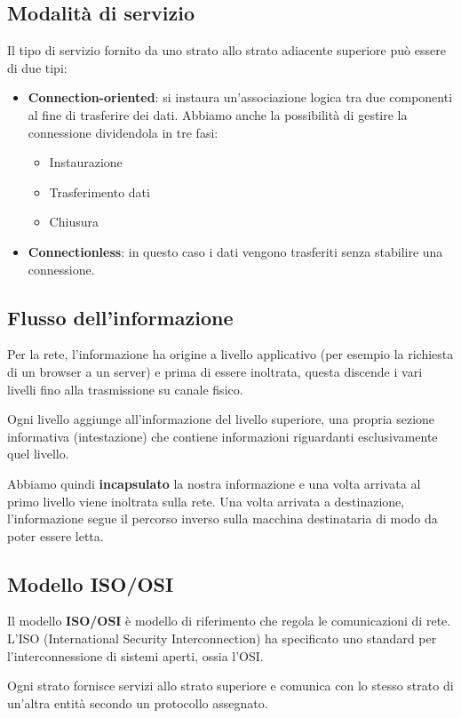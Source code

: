 \subsection{Modalità di servizio}
Il tipo di servizio fornito da uno strato allo strato adiacente superiore può essere di due tipi:
\begin{itemize}
	\item \textbf{Connection-oriented}: si instaura un'associazione logica tra due componenti al 
		fine di trasferire dei dati. Abbiamo anche la possibilità di gestire la connessione
		dividendola in tre fasi:
		\begin{itemize}
			\item Instaurazione
			\item Trasferimento dati
			\item Chiusura
		\end{itemize}
	\item \textbf{Connectionless}: in questo caso i dati vengono trasferiti senza stabilire una
		connessione.
\end{itemize}

\subsection{Flusso dell'informazione}
Per la rete, l'informazione ha origine a livello applicativo (per esempio la richiesta di un
browser a un server) e prima di essere inoltrata, questa discende i vari livelli fino alla
trasmissione su canale fisico.

Ogni livello aggiunge all'informazione del livello superiore, una propria sezione informativa
(intestazione) che contiene informazioni riguardanti esclusivamente quel livello.

Abbiamo quindi \textbf{incapsulato} la nostra informazione e una volta arrivata al primo livello 
viene inoltrata sulla rete. Una volta arrivata a destinazione, l'informazione segue il percorso
inverso sulla macchina destinataria di modo da poter essere letta.

\subsection{Modello ISO/OSI}
Il modello \textbf{ISO/OSI} è modello di riferimento che regola le comunicazioni di rete. L'ISO
(International Security Interconnection) ha specificato uno standard per l'interconnessione di
sistemi aperti, ossia l'OSI.

Ogni strato fornisce servizi allo strato superiore e comunica con lo stesso strato di un'altra 
entità secondo un protocollo assegnato.

